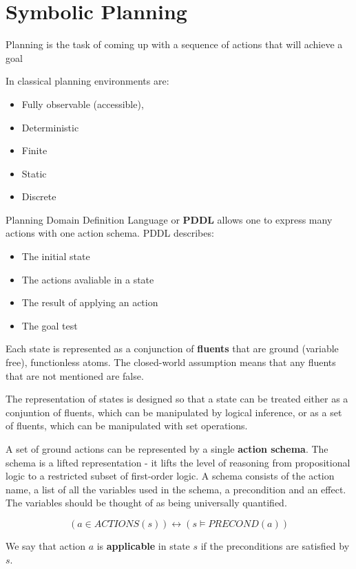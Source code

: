 \documentclass{article}
\begin{document}
\section{Symbolic Planning}

Planning is the task of coming up with a sequence of actions that will achieve a goal

In classical planning environments are:
\begin{itemize}
    \item Fully observable (accessible),
    \item Deterministic
    \item Finite
    \item Static 
    \item Discrete 
\end{itemize}

Planning Domain Definition Language or \textbf{PDDL} allows one to express many actions with one action schema.
PDDL describes:
\begin{itemize}
    \item The initial state
    \item The actions avaliable in a state
    \item The result of applying an action
    \item The goal test
\end{itemize}

Each state is represented as a conjunction of \textbf{fluents} that are ground (variable free), functionless atoms. The closed-world assumption means that any fluents that are not mentioned are false. 

The representation of states is designed so that a state can be treated either as a conjuntion of fluents, which can be manipulated by logical inference, or as a set of fluents, which can be manipulated with set operations. 


A set of ground  actions can be represented by a single \textbf{action schema}. The schema is a lifted representation - it lifts the level of reasoning from propositional logic to a restricted subset of first-order logic. A schema consists of the action name, a list of all the variables used in the schema, a precondition and an effect. The variables should be thought of as being universally quantified. 

$$(a \in ACTIONS(s)) \leftrightarrow (s \vDash PRECOND(a))$$

We say that action $a$ is \textbf{applicable} in state $s$ if the preconditions are satisfied by $s$. \newline
\end{document}
